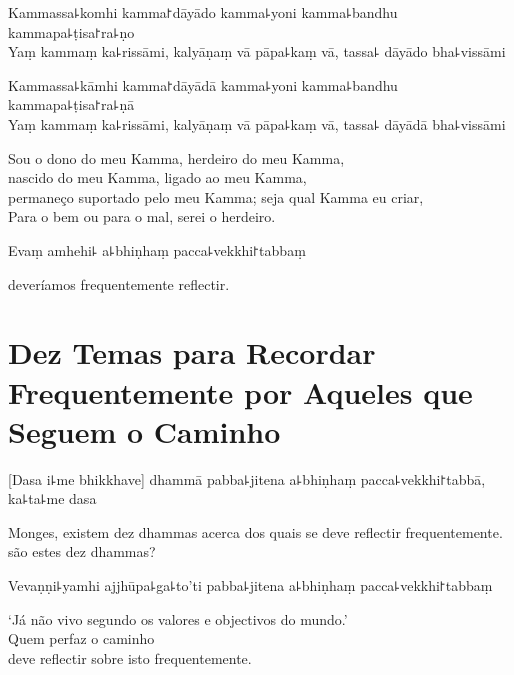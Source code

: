 %
Kammassa꜕komhi kamma꜓dāyādo kamma꜕yoni kamma꜕bandhu kammapa꜕ṭisa꜓ra꜕ṇo\\
Yaṃ kammaṃ ka꜕rissāmi, kalyāṇaṃ vā pāpa꜕kaṃ vā, tassa꜕ dāyādo bha꜕vissāmi

\clearpage

%
Kammassa꜕kāmhi kamma꜓dāyādā kamma꜕yoni kamma꜕bandhu kammapa꜕ṭisa꜓ra꜕ṇā\\
Yaṃ kammaṃ ka꜕rissāmi, kalyāṇaṃ vā pāpa꜕kaṃ vā, tassa꜕ dāyādā bha꜕vissāmi

\begin{english}
  Sou o dono do meu Kamma, herdeiro do meu Kamma,\\
  nascido do meu Kamma, ligado ao meu Kamma,\\
  permaneço suportado pelo meu Kamma; seja qual Kamma eu criar,\\
  Para o bem ou para o mal,  serei o herdeiro.
\end{english}

Evaṃ amhehi꜕ a꜕bhiṇhaṃ pacca꜕vekkhi꜓tabbaṃ

\begin{english}
   deveríamos frequentemente reflectir.
\end{english}

\chapter[Dez Temas]{Dez Temas para Recordar Frequentemente por Aqueles que Seguem o Caminho}


\enlargethispage{\baselineskip}

\begin{leader}
\end{leader}

[Dasa i꜕me bhikkhave] dhammā pabba꜕jitena a꜕bhiṇhaṃ pacca꜕vekkhi꜓tabbā, ka꜕ta꜕me dasa

\begin{english}
  Monges, existem dez dhammas acerca dos quais se deve reflectir frequentemente.  são estes dez dhammas?
\end{english}

Vevaṇṇi꜕yamhi ajjhūpa꜕ga꜕to'ti pabba꜕jitena a꜕bhiṇhaṃ pacca꜕vekkhi꜓tabbaṃ

\begin{english}
  `Já não vivo segundo os valores e objectivos do mundo.'\\
  Quem perfaz o caminho\\
  deve reflectir sobre isto frequentemente.
\end{english}

